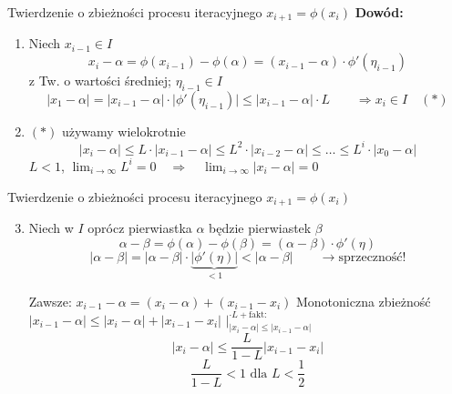 \begin{frame}{Twierdzenie o zbieżności procesu iteracyjnego $x_{i+1} = \phi(x_{i})$}
	\textbf{Dowód:}
	\begin{enumerate}
		\item Niech $x_{i-1} \in I$
		\[
			x_{i} - \alpha = \phi(x_{i-1}) - \phi(\alpha) = (x_{i-1} - \alpha) \cdot \phi'(\eta_{i-1})
		\]
		z Tw. o wartości średniej; $\eta_{i-1} \in I$
		\[
			\lvert x_{1} - \alpha \rvert = \lvert x_{i-1} - \alpha \rvert \cdot \lvert \phi'(\eta_{i-1}) \rvert \leq \lvert x_{i-1} - \alpha \rvert \cdot L \qquad \Rightarrow x_{i} \in I \quad(*)
		\]
		
		\item $(*)$ używamy wielokrotnie
		\[
			\lvert x_{i} - \alpha \rvert \leq L \cdot \lvert x_{i-1} - \alpha \rvert \leq L^{2} \cdot \lvert x_{i-2} - \alpha \rvert \leq \ldots \leq L^{i} \cdot \lvert x_{0} - \alpha \rvert
		\]
		$L < 1$, $\lim_{i \rightarrow \infty} L^{i} = 0 \quad \Rightarrow \quad \lim_{i \rightarrow \infty} \lvert x_{i} - \alpha \rvert = 0$
	\end{enumerate}
\end{frame}
\begin{frame}{Twierdzenie o zbieżności procesu iteracyjnego $x_{i+1} = \phi(x_{i})$}
	\begin{enumerate}
		\setcounter{enumi}{2}
		\item Niech w $I$ oprócz pierwiastka $\alpha$ będzie pierwiastek $\beta$
		\[
			\alpha - \beta = \phi(\alpha) - \phi(\beta) = (\alpha - \beta) \cdot \phi'(\eta)
		\]
		\[
			\lvert \alpha - \beta \rvert = \lvert \alpha - \beta \rvert \cdot \underbrace{\lvert \phi'(\eta) \rvert}_{< 1} < \lvert \alpha - \beta \rvert \qquad \rightarrow \text{sprzeczność!}
		\]
		
		Zawsze: $x_{i-1} - \alpha = (x_{i} - \alpha) + (x_{i-1} - x_{i})$\linebreak
		Monotoniczna zbieżność\linebreak
		$\lvert x_{i-1} - \alpha \rvert \leq \lvert x_{i} - \alpha \rvert + \lvert x_{i-1} - x_{i} \rvert$ $\vert^{\cdot L + \text{fakt:}}_{\lvert x_{i} - \alpha \rvert \leq \lvert x_{i-1} - \alpha \rvert}$
		\[
			\lvert x_{i} - \alpha \rvert \leq \frac{L}{1 - L} \lvert x_{i-1} - x_{i} \rvert
		\]
		\[
			\frac{L}{1 - L} < 1 \text{ dla } L < \frac{1}{2}
		\]
	\end{enumerate}
\end{frame}
